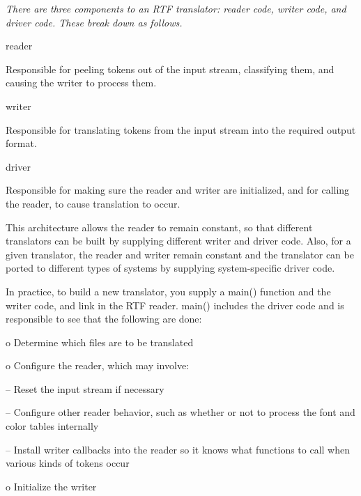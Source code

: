 \documentclass{article}
\begin{document}
\noindent
{\em There are three components to an RTF translator: reader code, writer 
code, and driver code. These break down as follows.



}
\noindent
reader	


\noindent
Responsible for peeling tokens out of the input stream, classifying them, 
and causing the writer to process them.




\noindent
writer	


\noindent
Responsible for translating tokens from the input stream into the required 
output format.




\noindent
driver	


\noindent
Responsible for making sure the reader and writer are initialized, and for 
calling the reader, to cause translation to occur.




\noindent
This architecture allows the reader to remain constant, so that different 
translators can be built by supplying different writer and driver code. Also, 
for a given translator, the reader and writer remain constant and the translator 
can be ported to different types of systems by supplying system-specific 
driver code.



\noindent
In practice, to build a new translator, you supply a main() function and 
the writer code, and link in the RTF reader. main() includes the driver code 
and is responsible to see that the following are done:




\noindent
o	Determine which files are to be translated



\noindent
o	Configure the reader, which may involve:




\noindent
--	Reset the input stream if necessary




\noindent
--	Configure other reader behavior, such as whether or not to process the font 
and color tables internally



\noindent
--	Install writer callbacks into the reader so it knows what functions to call 
when various kinds of tokens occur






\noindent
o	Initialize the writer
\end{document}
